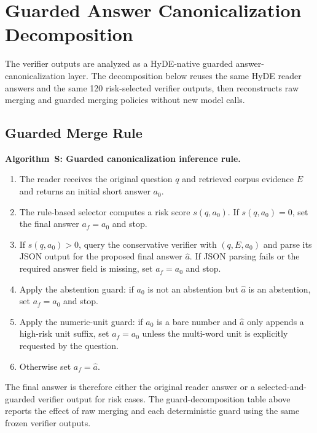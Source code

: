 \documentclass[pdflatex,sn-basic,Numbered]{sn-jnl}
\newcounter{algorithm}
\renewcommand{\thealgorithm}{S\arabic{algorithm}}
\begin{document}
\FloatBarrier
\section{Guarded Answer Canonicalization Decomposition}
\label{sec:supp_verifier_guard_decomposition}

The verifier outputs are analyzed as a HyDE-native guarded answer-canonicalization layer. The decomposition below reuses the same HyDE reader answers and the same 120 risk-selected verifier outputs, then reconstructs raw merging and guarded merging policies without new model calls.



\subsection{Guarded Merge Rule}
\label{sec:supp_guarded_merge_rule}

\noindent\textbf{Algorithm~\thealgorithm: Guarded canonicalization inference rule.}
\label{alg:guarded_canonicalization_rule}

\begin{enumerate}
    \item The reader receives the original question $q$ and retrieved corpus evidence $E$ and returns an initial short answer $a_0$.
    \item The rule-based selector computes a risk score $s(q,a_0)$. If $s(q,a_0)=0$, set the final answer $a_f=a_0$ and stop.
    \item If $s(q,a_0)>0$, query the conservative verifier with $(q,E,a_0)$ and parse its JSON output for the proposed final answer $\hat{a}$. If JSON parsing fails or the required answer field is missing, set $a_f=a_0$ and stop.
    \item Apply the abstention guard: if $a_0$ is not an abstention but $\hat{a}$ is an abstention, set $a_f=a_0$ and stop.
    \item Apply the numeric-unit guard: if $a_0$ is a bare number and $\hat{a}$ only appends a high-risk unit suffix, set $a_f=a_0$ unless the multi-word unit is explicitly requested by the question.
    \item Otherwise set $a_f=\hat{a}$.
\end{enumerate}
The final answer is therefore either the original reader answer or a selected-and-guarded verifier output for risk cases. The guard-decomposition table above reports the effect of raw merging and each deterministic guard using the same frozen verifier outputs.
\end{document}
